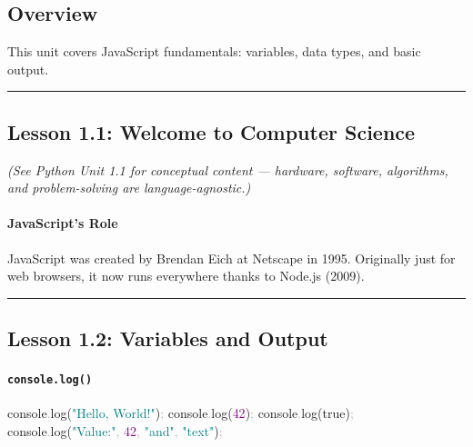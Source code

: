 \documentclass[
  justified,
  openright,
]{tufte-book}
\let\subsubsection\paragraph
\let\paragraph\paragraph
\newcommand{\BuiltInTok}[1]{#1}
\newcommand{\DecValTok}[1]{\textcolor{Purple}{#1}}
\newcommand{\FunctionTok}[1]{\textcolor{BrandBlue}{#1}}
\newcommand{\KeywordTok}[1]{\textcolor{BrandBlue}{#1}}
\newcommand{\NormalTok}[1]{#1}
\newcommand{\OperatorTok}[1]{\textcolor{DarkGray}{#1}}
\newcommand{\StringTok}[1]{\textcolor{Teal}{#1}}
\newenvironment{Shaded}{%
  \begin{snugshade}
}{%
  \end{snugshade}
}
\let\subsubsection\paragraph
\let\paragraph\paragraph
\begin{document}
\subsection{Overview}\label{overview}

This unit covers JavaScript fundamentals: variables, data types, and
basic output.

\begin{center}\rule{0.5\linewidth}{0.5pt}\end{center}

\subsection{Lesson 1.1: Welcome to Computer
Science}\label{lesson-1.1-welcome-to-computer-science}

\emph{(See Python Unit 1.1 for conceptual content --- hardware,
software, algorithms, and problem-solving are language-agnostic.)}

\subsubsection{JavaScript's Role}\label{javascripts-role}

JavaScript was created by Brendan Eich at Netscape in 1995. Originally
just for web browsers, it now runs everywhere thanks to Node.js (2009).

\begin{center}\rule{0.5\linewidth}{0.5pt}\end{center}

\subsection{Lesson 1.2: Variables and
Output}\label{lesson-1.2-variables-and-output}

\subsubsection{\texorpdfstring{\texttt{console.log()}}{console.log()}}\label{console.log}

\begin{Shaded}
\begin{Highlighting}[]
\BuiltInTok{console}\OperatorTok{.}\FunctionTok{log}\NormalTok{(}\StringTok{"Hello, World!"}\NormalTok{)}\OperatorTok{;}
\BuiltInTok{console}\OperatorTok{.}\FunctionTok{log}\NormalTok{(}\DecValTok{42}\NormalTok{)}\OperatorTok{;}
\BuiltInTok{console}\OperatorTok{.}\FunctionTok{log}\NormalTok{(}\KeywordTok{true}\NormalTok{)}\OperatorTok{;}
\BuiltInTok{console}\OperatorTok{.}\FunctionTok{log}\NormalTok{(}\StringTok{"Value:"}\OperatorTok{,} \DecValTok{42}\OperatorTok{,} \StringTok{"and"}\OperatorTok{,} \StringTok{"text"}\NormalTok{)}\OperatorTok{;}
\end{Highlighting}
\end{Shaded}
\end{document}
